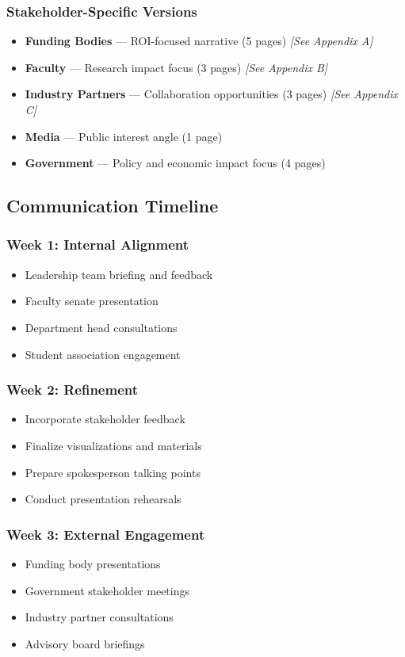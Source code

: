 \documentclass{article}
\begin{document}
\subsubsection{Stakeholder-Specific Versions}
\begin{itemize}
\item \textbf{Funding Bodies} --- ROI-focused narrative (5 pages) \textit{[See Appendix A]}
\item \textbf{Faculty} --- Research impact focus (3 pages) \textit{[See Appendix B]}
\item \textbf{Industry Partners} --- Collaboration opportunities (3 pages) \textit{[See Appendix C]}
\item \textbf{Media} --- Public interest angle (1 page)
\item \textbf{Government} --- Policy and economic impact focus (4 pages)
\end{itemize}

\subsection{Communication Timeline}

\subsubsection{Week 1: Internal Alignment}
\begin{itemize}
\item Leadership team briefing and feedback
\item Faculty senate presentation
\item Department head consultations
\item Student association engagement
\end{itemize}

\subsubsection{Week 2: Refinement}
\begin{itemize}
\item Incorporate stakeholder feedback
\item Finalize visualizations and materials
\item Prepare spokesperson talking points
\item Conduct presentation rehearsals
\end{itemize}

\subsubsection{Week 3: External Engagement}
\begin{itemize}
\item Funding body presentations
\item Government stakeholder meetings
\item Industry partner consultations
\item Advisory board briefings
\end{itemize}
\end{document}
